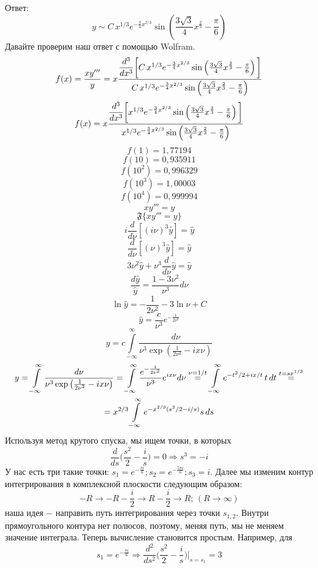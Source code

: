 


	Ответ:
		$$y\sim C\,x^{1/3}e^{-\frac{3}{4}x^{2/3}} \sin \left (\frac{3\sqrt3}{4}x^\frac{2}{3}-\frac{\pi}{6} \right )$$
	Давайте проверим наш ответ с помощью Wolfram.
	$$f(x) = \frac{x y'''}{y} = x \frac{\dfrac{d^3}{dx^3} \bigg{[}C\,x^{1/3}e^{-\frac{3}{4}x^{2/3}} \sin \left (\frac{3\sqrt3}{4}x^\frac{2}{3}-\frac{\pi}{6} \right ) \bigg{]}}{C\,x^{1/3}e^{-\frac{3}{4}x^{2/3}} \sin \left (\frac{3\sqrt3}{4}x^\frac{2}{3}-\frac{\pi}{6} \right )}$$
	$$f(x) =  x \frac{\dfrac{d^3}{dx^3} \bigg{[}x^{1/3}e^{-\frac{3}{4}x^{2/3}} \sin \left (\frac{3\sqrt3}{4}x^\frac{2}{3}-\frac{\pi}{6} \right ) \bigg{]}}{x^{1/3}e^{-\frac{3}{4}x^{2/3}} \sin \left (\frac{3\sqrt3}{4}x^\frac{2}{3}-\frac{\pi}{6} \right )}$$
	$$f(1) = 1,77194$$
	$$f(10) = 0,935911$$
	$$f(10^2) = 0,996329$$
	$$f(10^3) = 1,00003$$
	$$f(10^4) = 0,999994$$
	$$x y'''=y$$
	$$\mathfrak{F} \{ x y'''=y \}$$
	$$ i \frac{d}{d\nu} [ (i\nu)^3 \hat{y}] = \hat{y}$$
	$$ \frac{d}{d\nu} [ (\nu)^3 \hat{y}] = \hat{y}$$
	$$ 3\nu^2 \hat{y}+ \nu^3 \frac{d}{d\nu}\hat{y} = \hat{y}$$
	$$\frac{d\hat{y}}{\hat{y}} = \frac{1-3\nu^2}{\nu^3} d\nu$$
	$$\ln \hat{y} = -\frac{1}{2\nu^2} - 3 \ln\nu +C$$
	$$\hat{y} = \frac{c}{\nu^3} e^{-\frac{1}{2\nu^2}}$$
	$$y = c \int\limits_{-\infty }^{\infty }\frac{d\nu}{\nu^3\exp \left ( \frac{1}{2\nu^2}-ix\nu \right )}$$
	\begin{multline*}
		y=\int\limits_{-\infty }^{\infty }\frac{d\nu}{\nu^3\exp \left ( \frac{1}{2\nu^2}-ix\nu \right )}=\int\limits\limits_{-\infty}^{\infty }\frac{e^{-\frac{1}{2\nu^2}}}{\nu^3} e^{ix\nu}d\nu\overset{\nu=1/t}{=} \int\limits\limits_{-\infty}^\infty e^{-t^2/2+ix/t}\,t\,dt\overset{t=sx^{1/3}}{=}\\=x^{2/3}\int\limits\limits_{-\infty}^\infty e^{-x^{2/3}(s^2/2-i/s)}s\,ds
	\end{multline*}
	Используя метод крутого спуска, мы ищем точки, в которых
	$$\frac{d}{ds}\Big(\frac{s^2}{2}-\frac{i}{s}\Big)=0\Rightarrow s^3=-i$$
	У нас есть три такие точки: $\displaystyle s_1=e^{-\frac{\pi i}{6}}; s_2=e^{-\frac{5\pi i}{6}}; s_3=i$. Далее мы изменим контур интегрирования в комплексной плоскости следующим образом:
	$$-R\to-R-\frac{i}{2}\to R-\frac{i}{2}\to R;\, (R\to\infty)$$
	наша идея $-$ направить путь интегрирования через точки $s_{1,2}$. Внутри прямоугольного контура нет полюсов, поэтому, меняя путь, мы не меняем значение интеграла. Теперь вычисление становится простым. Например, для
	$$s_1=e^{-\frac{\pi i}{6}}\Rightarrow \frac{d^2}{ds^2}\Big(\frac{s^2}{2}-\frac{i}{s}\Big)\bigg|_{s=s_1}=3$$
